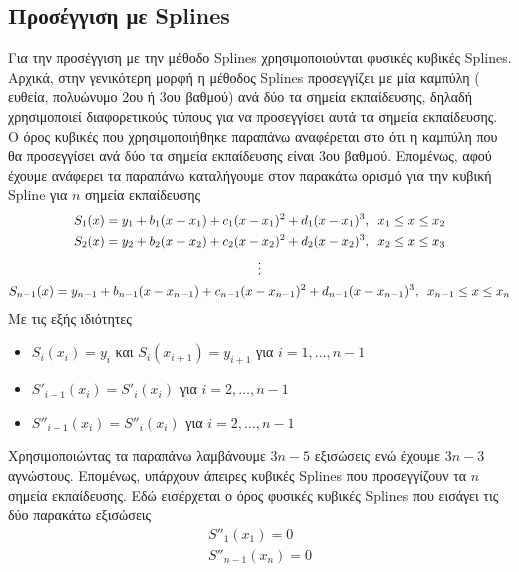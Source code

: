 \documentclass[Second Project.tex]{subfiles}
\begin{document}
\subsection{ Προσέγγιση με \textlatin{Splines} }

Για την προσέγγιση με την μέθοδο \textlatin{Splines} χρησιμοποιούνται φυσικές κυβικές \textlatin{Splines}. Αρχικά, 
στην γενικότερη μορφή η μέθοδος \textlatin{Splines} προσεγγίζει με μία καμπύλη ( ευθεία, πολυώνυμο 2ου ή 3ου βαθμού)
ανά δύο τα σημεία εκπαίδευσης, δηλαδή χρησιμοποιεί διαφορετικούς τύπους για να προσεγγίσει αυτά τα σημεία εκπαίδευσης.
Ο όρος κυβικές που χρησιμοποιήθηκε παραπάνω αναφέρεται στο ότι η καμπύλη που θα προσεγγίσει ανά δύο τα σημεία εκπαίδευσης
είναι 3ου βαθμού. Επομένως, αφού έχουμε ανάφερει τα παραπάνω καταλήγουμε στον παρακάτω ορισμό για την κυβική 
\textlatin{Spline} για $n$ σημεία εκπαίδευσης
\begin{gather*}
    S_{1}(x) = y_{1} +b_{1}(x-x_{1}) + c_{1}(x-x_{1})^{2} + d_{1}(x-x_{1})^{3} , \hspace{5px} x_{1} \leq x \leq x_{2} \\
    S_{2}(x) = y_{2} +b_{2}(x-x_{2}) + c_{2}(x-x_{2})^{2} + d_{2}(x-x_{2})^{3} , \hspace{5px} x_{2} \leq x \leq x_{3} \\ 
    \vdots \\
    S_{n-1}(x) = y_{n-1} +b_{n-1}(x-x_{n-1}) + c_{n-1}(x-x_{n-1})^{2} + d_{n-1}(x-x_{n-1})^{3} , \hspace{5px} x_{n-1} \leq x \leq x_{n} \\
\end{gather*}
Με τις εξής ιδιότητες 
\begin{itemize}
    \item $S_{i}(x_{i}) = y_{i} $ και $S_{i}(x_{i+1}) = y_{i+1} $ \hspace{5px} για \hspace{5px}$i = 1, \dots , n-1$
    \item $ S'_{i-1}(x_{i}) = S'_{i}(x_{i}) $ \hspace{5px} για \hspace{5px}$i = 2, \dots, n-1$
    \item $S''_{i-1}(x_{i}) = S''_{i}(x_{i}) $ \hspace{5px} για \hspace{5px}$i = 2, \dots, n-1$
\end{itemize}
Χρησιμοποιώντας τα παραπάνω λαμβάνουμε $3n-5$ εξισώσεις ενώ έχουμε $3n-3$ αγνώστους. Επομένως, υπάρχουν άπειρες κυβικές \textlatin{Splines}
που προσεγγίζουν τα $n$ σημεία εκπαίδευσης. Εδώ εισέρχεται ο όρος φυσικές κυβικές \textlatin{Splines} που εισάγει τις δύο παρακάτω εξισώσεις
\begin{gather*}
    S''_{1}(x_{1}) = 0 \\
    S''_{n-1}(x_{n}) = 0
\end{gather*}
\end{document}
